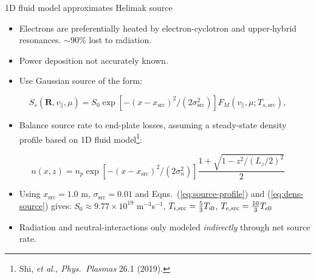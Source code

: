 \documentclass[12pt,table]{beamer}
\begin{document}
\begin{frame}{1D fluid model approximates Helimak source}
    \footnotesize
    \begin{itemize}
        \item Electrons are preferentially heated by electron-cyclotron and upper-hybrid resonances. $\sim90\%$ lost to radiation.
        \item Power deposition not accurately known. 
        \item Use Gaussian source of the form:
    \end{itemize}%
    \begin{equation}
    \label{eq:source-profile}
    S_s(\bm{R}, v_\parallel, \mu) = S_0 \exp[-(x - x_\mathrm{src})^2 / (2\sigma_\mathrm{src}^2)] F_M(v_\parallel, \mu; T_{s,\mathrm{src}}),
    \end{equation}%
    \vspace{-.25cm}
    \begin{itemize}
        \item Balance source rate to end-plate losses, assuming a steady-state density profile based on 1D fluid model\footnote{\scriptsize Shi, \emph{et al., Phys.~Plasmas} 26.1 (2019).}:
    \end{itemize}%
    \begin{equation}
    \label{eq:dens-source}
    n(x,z) = n_{p} \exp \left [-(x - x_\mathrm{src})^2 / \left (2\sigma_n^2 \right ) \right ] \frac{1 +\sqrt{1 - z^2/(L_z/2)^2}}{2}
    \end{equation}%
    \vspace{-.25cm}
        \begin{itemize}
        \item Using $x_\mathrm{src}=1.0$ m, $\sigma_\mathrm{src}=0.01$ and Eqns.~(\ref{eq:source-profile}) and (\ref{eq:dens-source}) gives: $S_0 \approx 9.77 \times 10^{19}$ m$^{-3}$s$^{-1}$, $T_{i,{\rm src}}=\frac{5}{3}T_{i0}$, $T_{e,{\rm src}}=\frac{10}{3}T_{e0}$
        \item Radiation and neutral-interactions only modeled \emph{indirectly} through net source rate.
    \end{itemize}
\end{frame}
\end{document}
